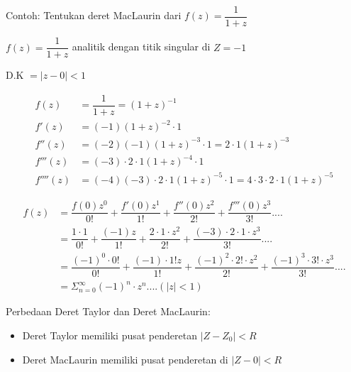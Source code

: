 \documentclass{article}
\begin{document}
\newpage

Contoh:
Tentukan deret MacLaurin dari $f(z)=\dfrac{1}{1+z}$

$f(z)=\dfrac{1}{1+z}$ analitik dengan titik singular di $Z = -1$

D.K $= |z-0|<1$

\begin{align}
    f(z)     & = \dfrac{1}{1+z} = (1+z)^{-1}
    \nonumber                                                                                      \\
    f'(z)    & = (-1)(1+z)^{-2} \cdot 1
    \nonumber                                                                                      \\
    f''(z)   & = (-2)(-1)(1+z)^{-3} \cdot 1 = 2 \cdot 1(1+z)^{-3}
    \nonumber                                                                                      \\
    f'''(z)  & = (-3) \cdot 2 \cdot 1 (1+z)^{-4} \cdot 1
    \nonumber                                                                                      \\
    f''''(z) & = (-4)(-3) \cdot 2 \cdot 1 (1+z)^{-5} \cdot 1 = 4 \cdot 3 \cdot 2 \cdot 1(1+z)^{-5}
    \nonumber
\end{align}

\begin{align}
    f(z) & = \dfrac{f(0)z^0}{0!} + \dfrac{f'(0)z^1}{1!} + \dfrac{f''(0)z^2}{2!} + \dfrac{f'''{(0)z^3}}{3!}....
    \nonumber                                                                                                                                              \\
         & = \dfrac{1 \cdot 1}{0!} + \dfrac{(-1)z}{1!} + \dfrac{ 2 \cdot 1 \cdot z^2}{2!} + \dfrac{(-3) \cdot 2 \cdot 1 \cdot z^3}{3!}....
    \nonumber                                                                                                                                              \\
         & = \dfrac{(-1)^0 \cdot 0!}{0!} + \dfrac{(-1) \cdot 1! z}{1!} + \dfrac{(-1)^2 \cdot 2! \cdot z^2}{2!} + \dfrac{(-1)^3 \cdot 3! \cdot z^3}{3!}....
    \nonumber                                                                                                                                              \\
         & = \Sigma_{n=0}^{\infty} (-1)^n \cdot z^n .... (|z|<1)
    \nonumber
\end{align}

Perbedaan Deret Taylor dan Deret MacLaurin:
\begin{itemize}
    \item Deret Taylor memiliki pusat penderetan $|Z-Z_0|<R$
    \item Deret MacLaurin memiliki pusat penderetan di $|Z-0|<R$
\end{itemize}
\end{document}
